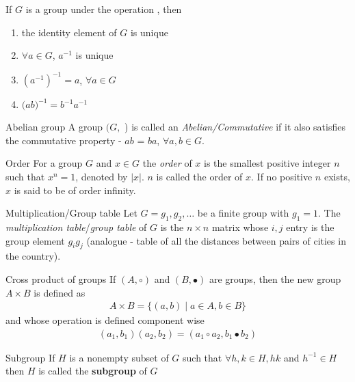 \documentclass[titlepage, 12pt]{article}
\begin{document}
If $G$ is a group under the operation , then
\begin{enumerate}
    \item the identity element of $G$ is unique
    \item $\forall a\in G$, $a^{-1}$ is unique
    \item $(a^{-1})^{-1} = a$, $\forall a\in G$
    \item $(a$$b)^{-1} = b^{-1}$$a^{-1}$
\end{enumerate}

\begin{definition}{Abelian group}{}
    A group $(G,$ ) is called an \textit{Abelian/Commutative} if
    it also satisfies the commutative property - $a$$b$ =
    $b$$a$, $\forall a, b\in G$.
\end{definition}

\begin{definition}{Order}{}
    For a group $G$ and $x\in G$ the \textit{order} of $x$ is the smallest
    positive integer $n$ such that $x^n = 1$, denoted by $|x|$. $n$ is
    called the order of $x$. If no positive $n$ exists, $x$ is said to be of
    order infinity.
\end{definition}

\begin{definition}{Multiplication/Group table}{}
  Let $G = {g_1, g_2,\ldots}$ be a finite group with $g_1 = 1$. The
    \textit{multiplication table}/\textit{group table} of $G$ is the
    $n\times n$ matrix whose $i, j$ entry is the group element $g_ig_j$
    (analogue - table of all the distances between pairs of cities in the
    country).
\end{definition}

\begin{definition}{Cross product of groups}{}
  If $(A, \circ)$ and $(B, \bullet)$ are groups, then the new group $A\times B$ is defined as
    \begin{gather*}
      A\times B = \{(a, b)\mid a\in A, b\in B\}
    \end{gather*}
    and whose operation is defined component wise
    \begin{gather*}
      (a_1, b_1)(a_2, b_2) = (a_1\circ a_2, b_1\bullet b_2)
    \end{gather*}
\end{definition}

\begin{definition}{Subgroup}{}
  If $H$ is a nonempty subset of $G$ such that $\forall h, k\in H, hk$ and
    $h^{-1}\in H$ then $H$ is called the \textbf{subgroup} of $G$
\end{definition}
\end{document}
